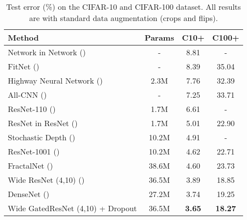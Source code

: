 \documentclass{article} %
\begin{document}







\begin{table}[h!]
\centering
    \begin{tabular}{ | l | c | c | c |}
    \hline
    Method    			& 		  	Params & C10+  & C100+  \\ \hline

    Network in Network (\cite{nin})			& 			-  & 	8.81  &  - \\ 
    FitNet (\cite{fitnet})			& 			-  & 	8.39   & 	35.04\\ 
    Highway Neural Network (\cite{highway})			& 			2.3M  & 	7.76   & 	32.39 \\
    All-CNN (\cite{allcnn})			& 			-  & 	7.25  & 	33.71  \\
\hline
    ResNet-110 (\cite{resnet1})			& 			1.7M  & 	6.61  & 	- \\ 
    ResNet in ResNet (\cite{rir})			& 			1.7M  & 	5.01   & 	22.90 \\ 
    Stochastic Depth (\cite{stdepth})	& 			10.2M & 	4.91   & 	- \\ 
    ResNet-1001 (\cite{resnet2}) & 			10.2M & 	4.62   & 	22.71 \\ 
    FractalNet (\cite{fractal}) & 			38.6M & 	4.60     & 	23.73 \\ 
    Wide ResNet (4,10) (\cite{wide})	& 			36.5M & 	3.89  & 	18.85 \\ 
    DenseNet (\cite{densenet})	& 			27.2M & 	3.74      & 	19.25\\ 
    Wide GatedResNet (4,10) + Dropout	& 			36.5M 	& 	\textbf{3.65}  & 	\textbf{18.27} \\ \hline
    \end{tabular}
\caption{Test error (\%) on the CIFAR-10 and CIFAR-100 dataset. All results are with standard data augmentation (crops and flips).}
    \label{cifar_all}   
\end{table}
\end{document}
